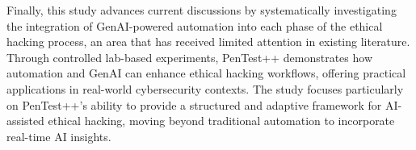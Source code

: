 Finally, this study advances current discussions by systematically investigating the integration of GenAI-powered automation  into each phase of the ethical hacking process, an area that has received limited attention in existing literature. Through controlled lab-based experiments, PenTest++ demonstrates how automation and GenAI can enhance ethical hacking workflows, offering practical applications in real-world cybersecurity contexts. The study focuses particularly on PenTest++'s ability to provide a structured and adaptive framework for AI-assisted ethical hacking, moving beyond traditional automation to incorporate real-time AI insights.